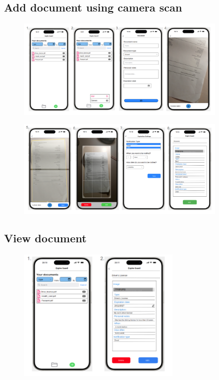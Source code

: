 	\subsection{Add document using camera scan}

		\begin{figure}[htbp]
			\centering
			\includegraphics[width=0.9\textwidth]{../mockups/add_doc_cam_1.png}  %
		\end{figure}

		\begin{figure}[htbp]
			\centering
			\includegraphics[width=0.9\textwidth]{../mockups/add_doc_cam_2.png}  %
		\end{figure}
		\clearpage
	\subsection{View document}
		
		\begin{figure}[htbp]
			\centering
			\includegraphics[width=0.7\textwidth]{../mockups/view_doc.png}  %
		\end{figure}
		\clearpage
